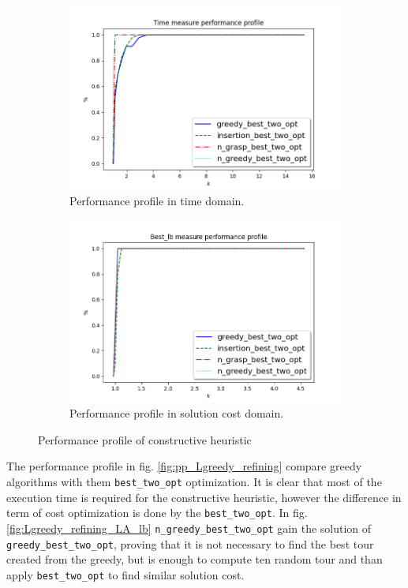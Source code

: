 \begin{figure}[!h]
	\centering
	\begin{subfigure}{.7\textwidth}
		\centering
		\includegraphics[width=\columnwidth]{../res/Lconstructives_refining_LA_time.png}
		\caption{Performance profile in time domain.}
		\label{fig:Lconstructives_refining_time}
	\end{subfigure}
	\begin{subfigure}{.7\textwidth}
		\centering
		\includegraphics[width=\columnwidth]{../res/Lconstructives_refining_LA_lb.png}
		\caption{Performance profile in solution cost domain.}
		\label{fig:Lconstructives_refining_lb}
	\end{subfigure}
\caption{Performance profile of constructive heuristic}
\label{fig:pp_Lconstructives_refining}
\end{figure}

The performance profile in fig. \ref{fig:pp_Lgreedy_refining} compare greedy algorithms with them \texttt{best\_two\_opt} optimization. It is clear that most of the execution time is required for the constructive heuristic, however the difference in term of cost optimization is done by the \texttt{best\_two\_opt}. In fig. \ref{fig:Lgreedy_refining_LA_lb} \texttt{n\_greedy\_best\_two\_opt} gain the solution of \texttt{greedy\_best\_two\_opt}, proving that it is not necessary to find the best tour created from the greedy, but is enough to compute ten random tour and than apply \texttt{best\_two\_opt} to find similar solution cost.

